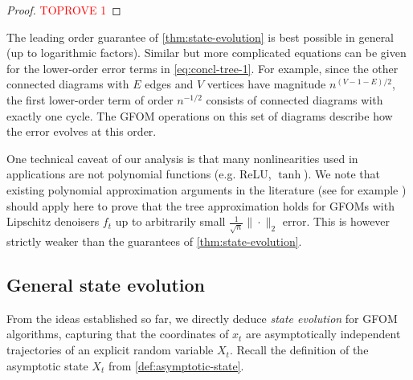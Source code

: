 \documentclass[12pt]{article}
\begin{document}
\begin{proof}\textcolor{red}{TOPROVE 1}\end{proof}



\begin{remark}\label{rem:lower-order}
    The leading order guarantee of \cref{thm:state-evolution} 
    is best possible in general
    (up to logarithmic factors). Similar but more complicated equations can be given
    for the lower-order error terms in \cref{eq:concl-tree-1}. For example, since the other connected diagrams with $E$ edges and $V$ vertices
    have magnitude $n^{(V - 1 - E)/2}$, the first lower-order term of order $n^{-1/2}$ consists
    of connected diagrams with exactly one cycle.
    The GFOM operations on this set of diagrams describe how the error evolves at this order.
\end{remark}

\begin{remark}
    One technical caveat of our analysis is that many nonlinearities used in applications are not polynomial functions (e.g. \textnormal{ReLU}, $\tanh$). We note that existing polynomial approximation arguments in the literature (see for example \cite{montanari2022equivalence, ivkov2023semidefinite}) should apply here to prove that the tree approximation holds for GFOMs with Lipschitz denoisers $f_t$ up to arbitrarily small $\frac 1 {\sqrt n}\|\cdot\|_2$ error. This is however strictly weaker than the guarantees of \cref{thm:state-evolution}.
\end{remark}





\subsection{General state evolution}
\label{sec:asymptotic-space}

From the ideas established so far, we directly deduce \emph{state evolution} for GFOM algorithms, capturing that
the coordinates of $x_t$ are asymptotically independent trajectories
of an explicit random variable $X_t$.
Recall the definition of the asymptotic state $X_t$ from \cref{def:asymptotic-state}.
\end{document}
